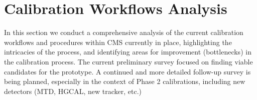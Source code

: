 \section{Calibration Workflows Analysis}
In this section we conduct a comprehensive analysis of the current calibration workflows and procedures within CMS currently in place, highlighting the intricacies of the process, and identifying areas for improvement (bottlenecks) in the calibration process. 
The current preliminary survey focused on finding viable candidates for the prototype. A continued and more detailed follow-up survey is being planned, especially in the context of Phase 2 calibrations, including new detectors (MTD, HGCAL, new tracker, etc.)

%


